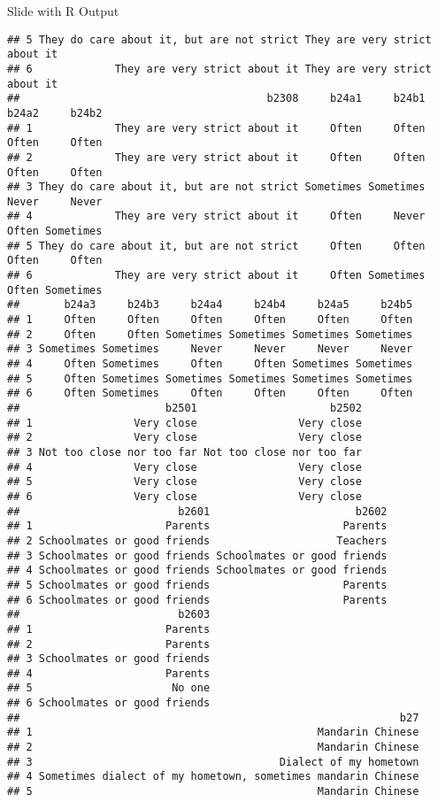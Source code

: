 \documentclass[
  ignorenonframetext,
]{beamer}
\begin{document}
\begin{frame}[fragile]{Slide with R Output}
\begin{verbatim}
## 5 They do care about it, but are not strict They are very strict about it
## 6             They are very strict about it They are very strict about it
##                                       b2308     b24a1     b24b1 b24a2     b24b2
## 1             They are very strict about it     Often     Often Often     Often
## 2             They are very strict about it     Often     Often Often     Often
## 3 They do care about it, but are not strict Sometimes Sometimes Never     Never
## 4             They are very strict about it     Often     Never Often Sometimes
## 5 They do care about it, but are not strict     Often     Often Often     Often
## 6             They are very strict about it     Often Sometimes Often Sometimes
##       b24a3     b24b3     b24a4     b24b4     b24a5     b24b5
## 1     Often     Often     Often     Often     Often     Often
## 2     Often     Often Sometimes Sometimes Sometimes Sometimes
## 3 Sometimes Sometimes     Never     Never     Never     Never
## 4     Often Sometimes     Often     Often Sometimes Sometimes
## 5     Often Sometimes Sometimes Sometimes Sometimes Sometimes
## 6     Often Sometimes     Often     Often     Often     Often
##                       b2501                     b2502
## 1                Very close                Very close
## 2                Very close                Very close
## 3 Not too close nor too far Not too close nor too far
## 4                Very close                Very close
## 5                Very close                Very close
## 6                Very close                Very close
##                         b2601                       b2602
## 1                     Parents                     Parents
## 2 Schoolmates or good friends                    Teachers
## 3 Schoolmates or good friends Schoolmates or good friends
## 4 Schoolmates or good friends Schoolmates or good friends
## 5 Schoolmates or good friends                     Parents
## 6 Schoolmates or good friends                     Parents
##                         b2603
## 1                     Parents
## 2                     Parents
## 3 Schoolmates or good friends
## 4                     Parents
## 5                      No one
## 6 Schoolmates or good friends
##                                                            b27
## 1                                             Mandarin Chinese
## 2                                             Mandarin Chinese
## 3                                       Dialect of my hometown
## 4 Sometimes dialect of my hometown, sometimes mandarin Chinese
## 5                                             Mandarin Chinese

\end{verbatim}
\end{frame}
\end{document}

